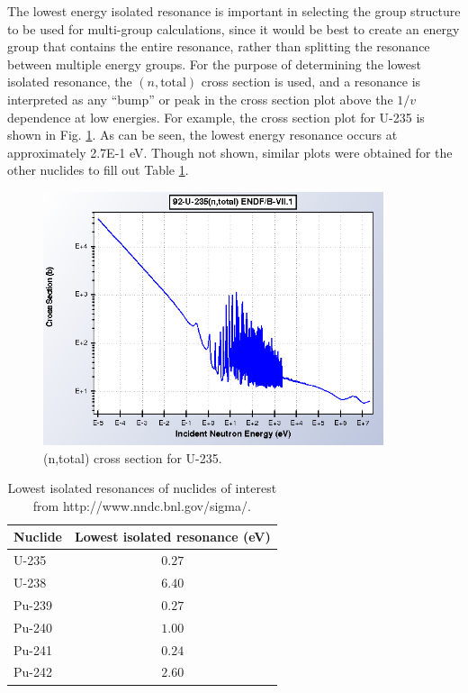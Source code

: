\documentclass[10pt]{article}
\numberwithin{equation}{section} %
\begin{document}
The lowest energy isolated resonance is important in selecting the group structure to be used for multi-group calculations, since it would be best to create an energy group that contains the entire resonance, rather than splitting the resonance between multiple energy groups. For the purpose of determining the lowest isolated resonance, the \((n,\textrm{total})\) cross section is used, and a resonance is interpreted as any ``bump'' or peak in the cross section plot above the \(1/v\) dependence at low energies. For example, the cross section plot for U-235 is shown in Fig. \ref{fig:U235}. As can be seen, the lowest energy resonance occurs at approximately 2.7E-1 eV. Though not shown, similar plots were obtained for the other nuclides to fill out Table \ref{table:2}.

\begin{figure}[H]
  \centering
  \includegraphics[width=10cm]{U235.pdf}
  \caption{(n,total) cross section for U-235.}
  \label{fig:U235}
\end{figure}

\begin{table}[H]
\caption{Lowest isolated resonances of nuclides of interest from http://www.nndc.bnl.gov/sigma/.}
\centering
\begin{tabular}{l c}
\hline\hline
Nuclide & Lowest isolated resonance (eV)\\ [0.5ex]
\hline
U-235 & \(0.27\)\\
U-238 & \(6.40\)\\
Pu-239 & \(0.27\)\\
Pu-240 & \(1.00\)\\
Pu-241 & \(0.24\)\\
Pu-242 & \(2.60\)\\
\hline
\end{tabular}
\label{table:2}
\end{table}
\end{document}
